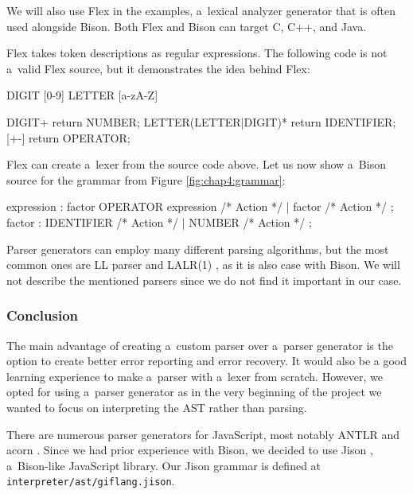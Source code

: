 We will also use Flex in the examples, a~lexical analyzer generator that is often used alongside Bison. Both Flex and Bison can target C, C++, and Java.

Flex takes token descriptions as regular expressions. The following code is not a~valid Flex source, but it demonstrates the idea behind Flex:
\begin{code}

DIGIT           [0-9]
LETTER          [a-zA-Z]

{DIGIT}+                        return NUMBER;
{LETTER}({LETTER}|{DIGIT})*     return IDENTIFIER;
[+-]                            return OPERATOR;
\end{code}

Flex can create a~lexer from the source code above. Let us now show a~Bison source for the grammar from Figure \ref{fig:chap4:grammar}:
\begin{code}


expression
    : factor OPERATOR expression    { /* Action */ }
    | factor                        { /* Action */ }
    ;
factor
    : IDENTIFIER                    { /* Action */ }
    | NUMBER                        { /* Action */ }
    ;
\end{code}

Parser generators can employ many different parsing algorithms, but the most common ones are LL parser and LALR(1) \cite{aho_sethi_ullman_2002}, as it is also
case with Bison. We will not describe the mentioned parsers since we do not find it important in our case.

\subsubsection*{Conclusion}
The main advantage of creating a~custom parser over a~parser generator is the option to create better error reporting and error recovery. It would also be a
good learning experience to make a~parser with a~lexer from scratch. However, we opted for using a~parser generator as in the very beginning of the project
we wanted to focus on interpreting the AST rather than parsing.

There are numerous parser generators for JavaScript, most notably ANTLR \cite{ANTLR} and acorn \cite{acorn}. Since we had prior experience with Bison, we
decided to use Jison \cite{Jison}, a~Bison-like JavaScript library. Our Jison grammar is defined at \texttt{interpreter/ast/giflang.jison}.

